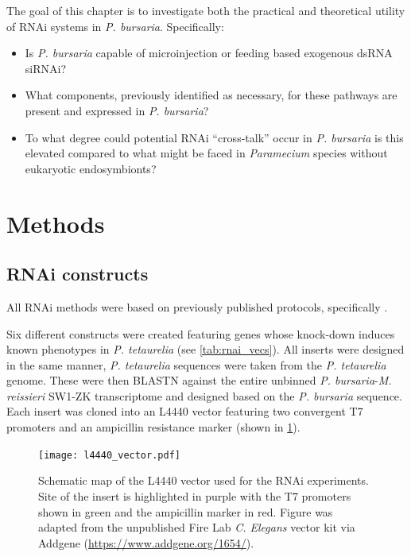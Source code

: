 The goal of this chapter is to investigate both the practical and
theoretical utility of RNAi systems in \textit{P. bursaria}. 
Specifically:
\begin{itemize}
    \item Is \textit{P. bursaria} capable of microinjection or feeding based
        exogenous dsRNA siRNAi?
    \item What components, previously identified as necessary, for these pathways
        are present and expressed in \textit{P. bursaria}? 
    \item To what degree could potential RNAi ``cross-talk'' occur in \textit{P. bursaria}
        is this elevated compared to what might be faced in \textit{Paramecium} species
        without eukaryotic endosymbionts?
\end{itemize}


\section{Methods}

\subsection{RNAi constructs}

All RNAi methods were based on previously published protocols, specifically
\citep{Galvani2001,Galvani2002,Beisson2010}.

Six different constructs were created featuring genes whose knock-down
induces known phenotypes in \textit{P. tetaurelia} (see \cref{tab:rnai_vecs}).
All inserts were designed in the same manner, \textit{P. tetaurelia} sequences
were taken from the \textit{P. tetaurelia} genome. 
These were then BLASTN against the entire unbinned \textit{P. bursaria}-\textit{M. reissieri}
SW1-ZK transcriptome and designed based on the \textit{P. bursaria} sequence.
Each insert was cloned into an L4440 vector featuring two convergent T7 promoters
and an ampicillin resistance marker (shown in \cref{fig:vec_map}). 

\begin{figure}
    \texttt{[image: l4440\_vector.pdf]}
    \caption[L4440 RNAi Vector Map]{Schematic map of the L4440 vector used for the RNAi experiments. Site of the insert is highlighted in purple with the T7 promoters shown in green and the ampicillin marker in red. Figure was adapted from the unpublished Fire Lab \textit{C. Elegans} vector kit via Addgene (\url{https://www.addgene.org/1654/}).}
    \label{fig:vec_map}
\end{figure}

